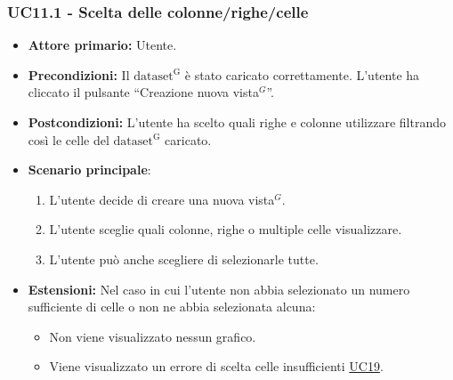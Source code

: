 \subsubsection{UC11.1 - Scelta delle colonne/righe/celle}
\label{sec:UC11.1}
\begin{itemize}
    \item \textbf{Attore primario:} Utente.
    \item \textbf{Precondizioni:} Il ${\mathrm{dataset^{G}}}$ è stato caricato correttamente. L'utente ha cliccato il pulsante ``Creazione nuova vista$^{G}$''.
    \item \textbf{Postcondizioni:} L'utente ha scelto quali righe e colonne utilizzare filtrando così le celle del ${\mathrm{dataset^{G}}}$ caricato.
    \item \textbf{Scenario principale}:
    \begin{enumerate}
		\item L'utente decide di creare una nuova vista$^{G}$.
		\item L'utente sceglie quali colonne, righe o multiple celle visualizzare.
		\item L'utente può anche scegliere di selezionarle tutte.
	\end{enumerate}
	\item \textbf{Estensioni:} Nel caso in cui l'utente non abbia selezionato un numero sufficiente di celle o non ne abbia selezionata alcuna:
              \begin{itemize}
                  \item Non viene visualizzato nessun grafico.
                  \item Viene visualizzato un errore di scelta celle insufficienti \hyperref[sec:UC19 - Errore-celle-insufficienti]{UC19}.
              \end{itemize}
\end{itemize}



